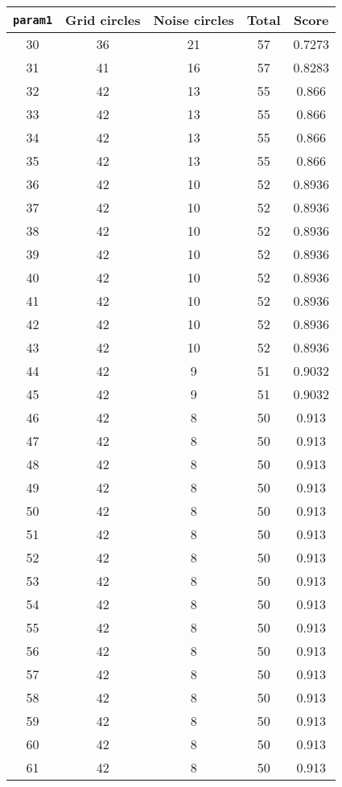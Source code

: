 \documentclass[letterpaper, 12pt]{article}
\begin{document}
\begin{longtable}{|c|c|c|c|c|}
\hline
\textbf{\texttt{param1}} & \textbf{Grid circles} & \textbf{Noise circles} & \textbf{Total} & \textbf{Score} \\
\hline
30 & 36 & 21 & 57 & 0.7273 \\
\hline
31 & 41 & 16 & 57 & 0.8283 \\
\hline
32 & 42 & 13 & 55 & 0.866 \\
\hline
33 & 42 & 13 & 55 & 0.866 \\
\hline
34 & 42 & 13 & 55 & 0.866 \\
\hline
35 & 42 & 13 & 55 & 0.866 \\
\hline
36 & 42 & 10 & 52 & 0.8936 \\
\hline
37 & 42 & 10 & 52 & 0.8936 \\
\hline
38 & 42 & 10 & 52 & 0.8936 \\
\hline
39 & 42 & 10 & 52 & 0.8936 \\
\hline
40 & 42 & 10 & 52 & 0.8936 \\
\hline
41 & 42 & 10 & 52 & 0.8936 \\
\hline
42 & 42 & 10 & 52 & 0.8936 \\
\hline
43 & 42 & 10 & 52 & 0.8936 \\
\hline
44 & 42 & 9 & 51 & 0.9032 \\
\hline
45 & 42 & 9 & 51 & 0.9032 \\
\hline
46 & 42 & 8 & 50 & 0.913 \\
\hline
47 & 42 & 8 & 50 & 0.913 \\
\hline
48 & 42 & 8 & 50 & 0.913 \\
\hline
49 & 42 & 8 & 50 & 0.913 \\
\hline
50 & 42 & 8 & 50 & 0.913 \\
\hline
51 & 42 & 8 & 50 & 0.913 \\
\hline
52 & 42 & 8 & 50 & 0.913 \\
\hline
53 & 42 & 8 & 50 & 0.913 \\
\hline
54 & 42 & 8 & 50 & 0.913 \\
\hline
55 & 42 & 8 & 50 & 0.913 \\
\hline
56 & 42 & 8 & 50 & 0.913 \\
\hline
57 & 42 & 8 & 50 & 0.913 \\
\hline
58 & 42 & 8 & 50 & 0.913 \\
\hline
59 & 42 & 8 & 50 & 0.913 \\
\hline
60 & 42 & 8 & 50 & 0.913 \\
\hline
61 & 42 & 8 & 50 & 0.913 \\

\end{longtable}
\end{document}
